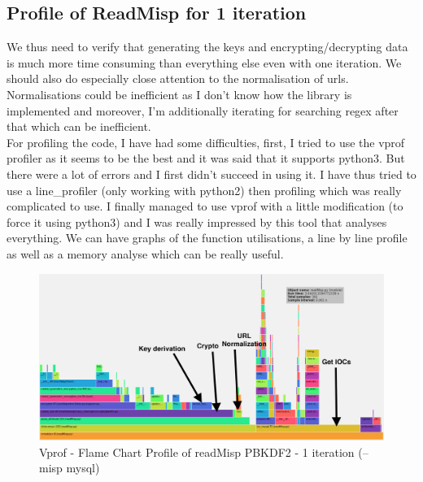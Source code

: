 \documentclass{eplmastersthesis}
\begin{document}
\subsection{Profile of ReadMisp for 1 iteration}
We thus need to verify that generating the keys and encrypting/decrypting data is much more time consuming than everything else even with one iteration.
We should also do especially close attention to the normalisation of \glspl{url}. Normalisations could be inefficient as I don't know how the library is implemented and moreover, I'm additionally iterating for searching regex after that which can be inefficient.\\

For profiling the code, I have had some difficulties, first, I tried to use the vprof profiler as it seems to be the best and it was said that it supports python3.
But there were a lot of errors and I first didn't succeed in using it. I have thus tried to use a line\_profiler (only working with python2) then profiling which was really complicated to use. 
I finally managed to use vprof with a little modification (to force it using python3) and I was really impressed by this tool that analyses everything. We can have graphs of the function utilisations, a line by line profile as well as a memory analyse which can be really useful.\\

\begin{figure}[h!]
\begin{center}
	\includegraphics[scale=0.3]{res/profile-1iter}
	\caption{Vprof - Flame Chart Profile of readMisp PBKDF2 - 1 iteration (--misp mysql)}
	\label{profile-readMisp}
\end{center}
\end{figure}
\end{document}
